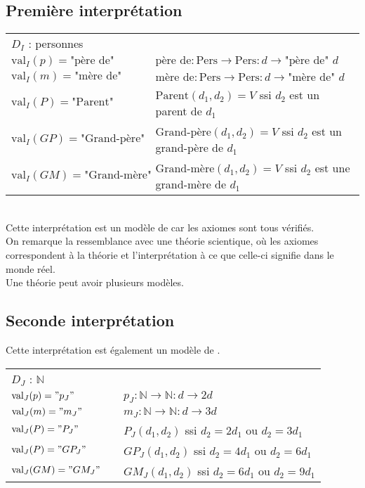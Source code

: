 \subsection*{Première interprétation}
\begin{tabular}{lll}
$D_I$ : personnes&&\\
$\text{val}_I(p)=\text{"père de"}$ &\hspace*{1cm} &$\text{père de} : \text{Pers}\rightarrow\text{Pers} : d \rightarrow \text{"père de" }d$\\
$\text{val}_I(m)=\text{"mère de"}$ &\hspace*{1cm} &$\text{mère de} : \text{Pers}\rightarrow\text{Pers} : d \rightarrow \text{"mère de" }d$\\
$\text{val}_I(P)=\text{"Parent"}$ &\hspace*{1cm} &$\text{Parent}(d_1,d_2)=V$ ssi $d_2$ est un parent de $d_1$\\
$\text{val}_I(GP)=\text{"Grand-père"}$ &\hspace*{1cm} &$\text{Grand-père}(d_1,d_2)=V$ ssi $d_2$ est un grand-père de $d_1$\\
$\text{val}_I(GM)=\text{"Grand-mère"}$ &\hspace*{1cm} &$\text{Grand-mère}(d_1,d_2)=V$ ssi $d_2$ est une grand-mère de $d_1$\\
\end{tabular}\\

Cette interprétation est un modèle de  car les axiomes sont tous vérifiés.\\
On remarque la ressemblance avec une théorie scientique, où les axiomes correspondent à la théorie et l'interprétation à ce que celle-ci signifie dans le monde réel.\\
Une théorie peut avoir plusieurs modèles.\\ 
\subsection*{Seconde interprétation}
Cette interprétation est également un modèle de .\\

\begin{tabular}{lll}
$D_J$ : $\mathbb{N}$&&\\
$\text{val}_J(p)="p_J"$ &\hspace*{1cm} &$p_J : \mathbb{N}\rightarrow\mathbb{N} : d \rightarrow 2d$\\
$\text{val}_J(m)="m_J"$ &\hspace*{1cm} &$m_J : \mathbb{N}\rightarrow\mathbb{N} : d \rightarrow 3d$\\
$\text{val}_J(P)="P_J"$ &\hspace*{1cm} &$P_J(d_1,d_2)$ ssi $d_2=2d_1$ ou $d_2=3d_1$\\
$\text{val}_J(P)="GP_J"$ &\hspace*{1cm} &$GP_J(d_1,d_2)$ ssi $d_2=4d_1$ ou $d_2=6d_1$\\
$\text{val}_J(GM)="GM_J"$ &\hspace*{1cm} &$GM_J(d_1,d_2)$ ssi $d_2=6d_1$ ou $d_2=9d_1$\\
\end{tabular}\\

